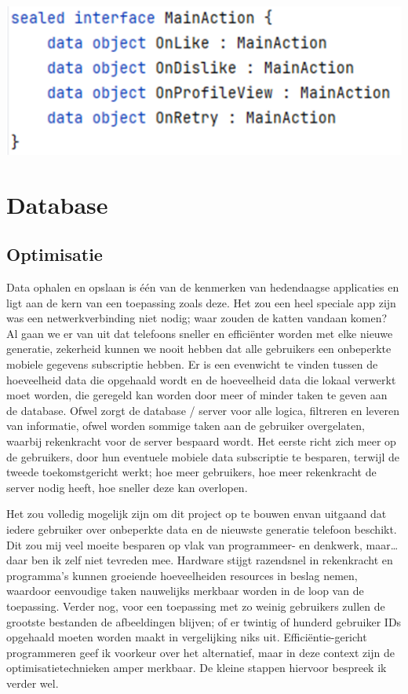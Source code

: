 \documentclass{report}
\begin{document}
\begin{center}
    \includegraphics{MVVM_Action}
\end{center}



\section{Database}
\subsection{Optimisatie}
Data ophalen en opslaan is één van de kenmerken van hedendaagse applicaties en ligt aan de kern van een toepassing zoals deze.
Het zou een heel speciale app zijn was een netwerkverbinding niet nodig; waar zouden de katten vandaan komen?
Al gaan we er van uit dat telefoons sneller en efficiënter worden met elke nieuwe generatie, zekerheid kunnen we nooit hebben dat alle gebruikers een onbeperkte mobiele gegevens subscriptie hebben.
Er is een evenwicht te vinden tussen de hoeveelheid data die opgehaald wordt en de hoeveelheid data die lokaal verwerkt moet worden, die geregeld kan worden door meer of minder taken te geven aan de database.
Ofwel zorgt de database / server voor alle logica, filtreren en leveren van informatie, ofwel worden sommige taken aan de gebruiker overgelaten, waarbij rekenkracht voor de server bespaard wordt.
Het eerste richt zich meer op de gebruikers, door hun eventuele mobiele data subscriptie te besparen, terwijl de tweede toekomstgericht werkt;
hoe meer gebruikers, hoe meer rekenkracht de server nodig heeft, hoe sneller deze kan overlopen.


Het zou volledig mogelijk zijn om dit project op te bouwen envan uitgaand dat iedere gebruiker over onbeperkte data en de nieuwste generatie telefoon beschikt.
Dit zou mij veel moeite besparen op vlak van programmeer- en denkwerk, maar\ldots daar ben ik zelf niet tevreden mee.
Hardware stijgt razendsnel in rekenkracht en programma's kunnen groeiende hoeveelheiden resources in beslag nemen, waardoor eenvoudige taken nauwelijks merkbaar worden in de loop van de toepassing.
Verder nog, voor een toepassing met zo weinig gebruikers zullen de grootste bestanden de afbeeldingen blijven; of er twintig of hunderd gebruiker IDs opgehaald moeten worden maakt in vergelijking niks uit.
Efficiëntie-gericht programmeren geef ik voorkeur over het alternatief, maar in deze context zijn de optimisatietechnieken amper merkbaar.
De kleine stappen hiervoor bespreek ik verder wel.
\end{document}
